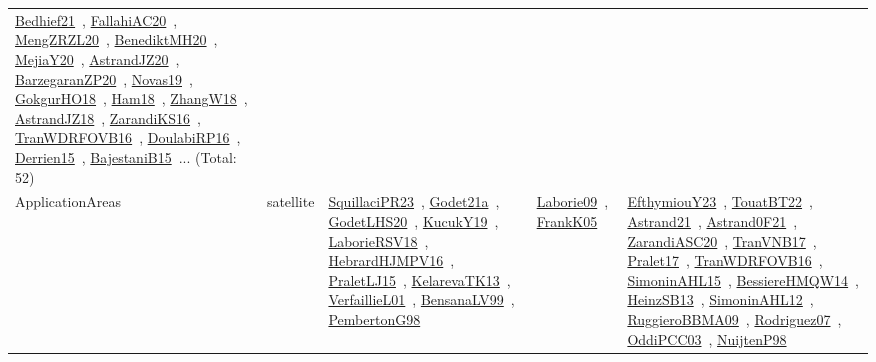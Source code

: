 {\begin{longtable}{lp{3cm}>{\raggedright\arraybackslash}p{6cm}>{\raggedright\arraybackslash}p{6cm}>{\raggedright\arraybackslash}p{8cm}}
\href{works/Bedhief21.pdf}{Bedhief21}~\cite{Bedhief21}, \href{works/FallahiAC20.pdf}{FallahiAC20}~\cite{FallahiAC20}, \href{works/MengZRZL20.pdf}{MengZRZL20}~\cite{MengZRZL20}, \href{works/BenediktMH20.pdf}{BenediktMH20}~\cite{BenediktMH20}, \href{works/MejiaY20.pdf}{MejiaY20}~\cite{MejiaY20}, \href{works/AstrandJZ20.pdf}{AstrandJZ20}~\cite{AstrandJZ20}, \href{works/BarzegaranZP20.pdf}{BarzegaranZP20}~\cite{BarzegaranZP20}, \href{works/Novas19.pdf}{Novas19}~\cite{Novas19}, \href{works/GokgurHO18.pdf}{GokgurHO18}~\cite{GokgurHO18}, \href{works/Ham18.pdf}{Ham18}~\cite{Ham18}, \href{works/ZhangW18.pdf}{ZhangW18}~\cite{ZhangW18}, \href{works/AstrandJZ18.pdf}{AstrandJZ18}~\cite{AstrandJZ18}, \href{works/ZarandiKS16.pdf}{ZarandiKS16}~\cite{ZarandiKS16}, \href{works/TranWDRFOVB16.pdf}{TranWDRFOVB16}~\cite{TranWDRFOVB16}, \href{works/DoulabiRP16.pdf}{DoulabiRP16}~\cite{DoulabiRP16}, \href{works/Derrien15.pdf}{Derrien15}~\cite{Derrien15}, \href{works/BajestaniB15.pdf}{BajestaniB15}~\cite{BajestaniB15}... (Total: 52)\\
ApplicationAreas & satellite & \href{works/SquillaciPR23.pdf}{SquillaciPR23}~\cite{SquillaciPR23}, \href{works/Godet21a.pdf}{Godet21a}~\cite{Godet21a}, \href{works/GodetLHS20.pdf}{GodetLHS20}~\cite{GodetLHS20}, \href{works/KucukY19.pdf}{KucukY19}~\cite{KucukY19}, \href{works/LaborieRSV18.pdf}{LaborieRSV18}~\cite{LaborieRSV18}, \href{works/HebrardHJMPV16.pdf}{HebrardHJMPV16}~\cite{HebrardHJMPV16}, \href{works/PraletLJ15.pdf}{PraletLJ15}~\cite{PraletLJ15}, \href{works/KelarevaTK13.pdf}{KelarevaTK13}~\cite{KelarevaTK13}, \href{works/VerfaillieL01.pdf}{VerfaillieL01}~\cite{VerfaillieL01}, \href{works/BensanaLV99.pdf}{BensanaLV99}~\cite{BensanaLV99}, \href{works/PembertonG98.pdf}{PembertonG98}~\cite{PembertonG98} & \href{works/Laborie09.pdf}{Laborie09}~\cite{Laborie09}, \href{works/FrankK05.pdf}{FrankK05}~\cite{FrankK05} & \href{works/EfthymiouY23.pdf}{EfthymiouY23}~\cite{EfthymiouY23}, \href{works/TouatBT22.pdf}{TouatBT22}~\cite{TouatBT22}, \href{works/Astrand21.pdf}{Astrand21}~\cite{Astrand21}, \href{works/Astrand0F21.pdf}{Astrand0F21}~\cite{Astrand0F21}, \href{works/ZarandiASC20.pdf}{ZarandiASC20}~\cite{ZarandiASC20}, \href{works/TranVNB17.pdf}{TranVNB17}~\cite{TranVNB17}, \href{works/Pralet17.pdf}{Pralet17}~\cite{Pralet17}, \href{works/TranWDRFOVB16.pdf}{TranWDRFOVB16}~\cite{TranWDRFOVB16}, \href{works/SimoninAHL15.pdf}{SimoninAHL15}~\cite{SimoninAHL15}, \href{works/BessiereHMQW14.pdf}{BessiereHMQW14}~\cite{BessiereHMQW14}, \href{works/HeinzSB13.pdf}{HeinzSB13}~\cite{HeinzSB13}, \href{works/SimoninAHL12.pdf}{SimoninAHL12}~\cite{SimoninAHL12}, \href{works/RuggieroBBMA09.pdf}{RuggieroBBMA09}~\cite{RuggieroBBMA09}, \href{works/Rodriguez07.pdf}{Rodriguez07}~\cite{Rodriguez07}, \href{works/OddiPCC03.pdf}{OddiPCC03}~\cite{OddiPCC03}, \href{works/NuijtenP98.pdf}{NuijtenP98}~\cite{NuijtenP98}\\

\end{longtable}}
